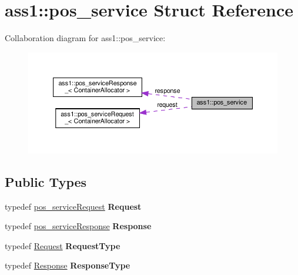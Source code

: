 \hypertarget{structass1_1_1pos__service}{}\section{ass1\+:\+:pos\+\_\+service Struct Reference}
\label{structass1_1_1pos__service}


Collaboration diagram for ass1\+:\+:pos\+\_\+service\+:
\nopagebreak
\begin{figure}[H]
\begin{center}
\leavevmode
\includegraphics[width=350pt]{structass1_1_1pos__service__coll__graph}
\end{center}
\end{figure}
\subsection*{Public Types}
\begin{DoxyCompactItemize}
\item 
\mbox{\label{structass1_1_1pos__service_a0df98c70ee460671bddf74cea17f3af6}} 
typedef \hyperlink{structass1_1_1pos__serviceRequest__}{pos\+\_\+service\+Request} {\bfseries Request}
\item 
\mbox{\label{structass1_1_1pos__service_ace05d62fc370ca9933d30208ed376aa1}} 
typedef \hyperlink{structass1_1_1pos__serviceResponse__}{pos\+\_\+service\+Response} {\bfseries Response}
\item 
\mbox{\label{structass1_1_1pos__service_a254ebd22137495c4262c84acc3ef57ad}} 
typedef \hyperlink{structass1_1_1pos__serviceRequest__}{Request} {\bfseries Request\+Type}
\item 
\mbox{\label{structass1_1_1pos__service_a6b3e396b3dc411ef484b5ca03c830c04}} 
typedef \hyperlink{structass1_1_1pos__serviceResponse__}{Response} {\bfseries Response\+Type}
\end{DoxyCompactItemize}
